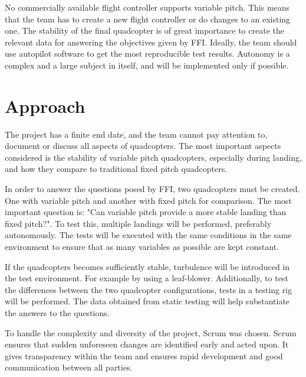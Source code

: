 No commercially available flight controller supports variable pitch. This means that the team has to create a new flight controller or do changes to an existing one. The stability of the final quadcopter is of great importance to create the relevant data for answering the objectives given by FFI.  
Ideally, the team should use autopilot software to get the most reproducible test results. Autonomy is a complex and a large subject in itself, and will be implemented only if possible. \bigskip

\section*{Approach}
The project has a finite end date, and the team cannot pay attention to, document or discuss all aspects of quadcopters. The most important aspects considered is the stability of variable pitch quadcopters, especially during landing, and how they compare to traditional fixed pitch quadcopters. \bigskip

In order to answer the questions posed by FFI, two quadcopters must be created. One with variable pitch and another with fixed pitch for comparison. The most important question is: "Can variable pitch provide a more stable landing than fixed pitch?". To test this, multiple landings will be performed, preferably autonomously. The tests will be executed with the same conditions in the same environment to ensure that as many variables as possible are kept constant.\bigskip 

If the quadcopters becomes sufficiently stable, turbulence will be introduced in the test environment. For example by using a leaf-blower. Additionally, to test the differences between the two quadcopter configurations, tests in a testing rig will be performed. The data obtained from static testing will help substantiate the answers to the questions.\bigskip

To handle the complexity and diversity of the project, Scrum was chosen. Scrum ensures that sudden unforeseen changes are identified early and acted upon. It gives transparency within the team and ensures rapid development and good communication between all parties.



